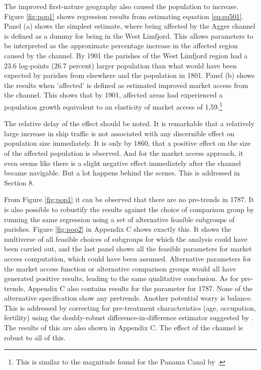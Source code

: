 \documentclass[11pt]{article}
\begin{document}
The improved first-nature geography also caused the population to increase. Figure \ref{fig:pop1} shows regression results from estimating equation \ref{eq:eq501}. Panel (a) shows the simplest estimate, where being affected by the Agger channel is defined as a dummy for being in the West Limfjord. This allows parameters to be interpreted as the approximate percentage increase in the affected region caused by the channel. By 1901 the parishes of the West Limfjord region had a 23.6 log-points (26.7 percent) larger population than what would have been expected by parishes from elsewhere and the population in 1801. Panel (b) shows the results when 'affected' is defined as estimated improved market access from the channel. This shows that by 1901, affected areas had experienced a population growth equivalent to an elasticity of market access of 1.59.\footnote{This is similar to the magnitude found for the Panama Canal by \cite{rauch2022a}.}

The relative delay of the effect should be noted. It is remarkable that a relatively large increase in ship traffic is not associated with any discernible effect on population size immediately. It is only by 1860, that a positive effect on the size of the affected population is observed. And for the market access approach, it even seems like there is a slight negative effect immediately after the channel became navigable. But a lot happens behind the scenes. This is addressed in Section 8. 

From Figure \ref{fig:pop1} it can be observed that there are no pre-trends in 1787. It is also possible to robustify the results against the choice of comparison group by running the same regression using a set of alternative feasible subgroups of parishes. Figure \ref{fig:pop2} in Appendix C shows exactly this. It shows the multiverse of all feasible choices of subgroups \citep{Steegen2016multiverse} for which the analysis could have been carried out, and the last panel shows all the feasible parameters for market access computation, which could have been assumed. Alternative parameters for the market access function or alternative comparison groups would all have generated positive results, leading to the same qualitative conclusion. As for pre-trends, Appendix C also contains results for the parameter for 1787. None of the alternative specification show any pretrends. Another potential worry is balance. This is addressed by correcting for pre-treatment characteristics (age, occupation, fertility) using the doubly-robust difference-in-difference estimator suggested by \cite{Callaway2021did}. The results of this are also shown in Appendix C. The effect of the channel is robust to all of this.
\end{document}
